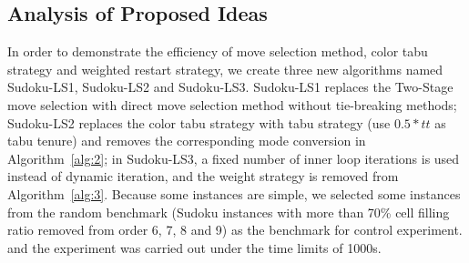 \documentclass{article}
\begin{document}
            

\subsection{Analysis of Proposed Ideas}

In order to demonstrate the efficiency of move selection method, color tabu strategy and weighted restart strategy, we create three new algorithms named Sudoku-LS1, Sudoku-LS2 and Sudoku-LS3. Sudoku-LS1 replaces the Two-Stage move selection with direct move selection method without tie-breaking methods; Sudoku-LS2 replaces the color tabu strategy with tabu strategy (use $0.5*tt$ as tabu tenure) and removes the corresponding mode conversion in Algorithm~\ref{alg:2}; in Sudoku-LS3, a fixed number of inner loop iterations is used instead of dynamic iteration, and the weight strategy is removed from Algorithm~\ref{alg:3}. Because some instances are simple, we selected some instances from the random benchmark (Sudoku instances with more than 70\% cell filling ratio removed from order 6, 7, 8 and 9) as the benchmark for control experiment. and the experiment was carried out under the time limits of 1000s.
\end{document}
